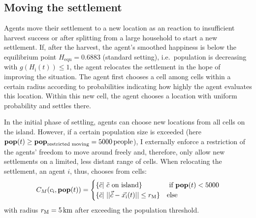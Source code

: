 \subsection{Moving the settlement}
Agents move their settlement to a new location as an reaction to insufficient harvest success or after splitting from a large household to start a new settlement.
If, after the harvest, the agent's smoothed happiness is below the equilibrium point $H_\text{equ}=0.6883$ (standard setting), i.e.\ population is decreasing with $g(H_\text{i}(t))\leq 1$, the agent relocates the settlement in the hope of improving the situation.
The agent first chooses a cell among cells  within a certain radius according to probabilities indicating how highly the agent evaluates this location.
Within this new cell, the agent chooses a location with uniform probability and settles there.

In the initial phase of settling, agents can choose new locations from all cells on the island.
However, if a certain population size is exceeded (here $\mathbf{pop}(t)\geq \mathbf{pop}_\text{restricted moving} = 5000 \, \rm{people}$), I externally enforce a restriction of the agents' freedom to move around freely and, therefore, only allow new settlements on a limited, less distant range of cells. 
When relocating the settlement, an agent $i$, thus, chooses from cells:
\begin{equation}
C_{M}(c_{\rm i}, \mathbf{pop}(t)) = 
\begin{cases}
\{\tilde{c} | \ \tilde{c}\text{ on island}\} & \text{ if } \mathbf{pop}(t) <5000 \\
\{\tilde{c} | \ | | \vec{\tilde{c}} - \vec{x_{\rm i}}(t) | |
\leq r_{\rm M} \} & \text{else} 
\end{cases}
\end{equation}
with radius $r_{\rm M} = 5\, {\rm km}$ after exceeding the population threshold.


